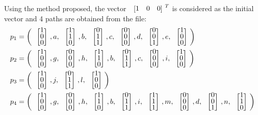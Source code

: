 

Using the method proposed, the vector $\colvec{1&0&0}^ T$ is considered as the initial vector and 4 paths are obtained from the file:
\setlength\arraycolsep{2pt}
\begin{align*}
  p_1&= \left(\colvec{1\\0\\0},a,\colvec{1\\1\\0},b,\colvec{0\\1\\1},c,\colvec{0\\0\\0},d,\colvec{0\\0\\1},e,\colvec{1\\0\\0}\right) \\
  p_2&= \left(\colvec{1\\0\\0},g,\colvec{0\\0\\0},h,\colvec{1\\1\\0},b,\colvec{0\\1\\1},c,\colvec{0\\0\\0},i,\colvec{1\\0\\0}\right) \\
  p_3&= \left(\colvec{1\\0\\0},j,\colvec{0\\1\\1},l,\colvec{1\\0\\0}\right) \\
  p_4&= \left(\colvec{1\\0\\0},g,\colvec{0\\0\\0},h,\colvec{1\\1\\0},b,\colvec{0\\1\\1},i,\colvec{1\\1\\1},m,\colvec{0\\0\\0},d,\colvec{0\\0\\1},n,\colvec{1\\1\\0}\right) \\
\end{align*}
